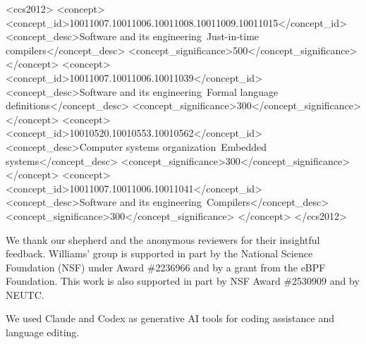 \documentclass[sigplan,10pt]{acmart}
\begin{document}
\begin{CCSXML}
<ccs2012>
 <concept>
  <concept_id>10011007.10011006.10011008.10011009.10011015</concept_id>
  <concept_desc>Software and its engineering~Just-in-time compilers</concept_desc>
  <concept_significance>500</concept_significance>
 </concept>
 <concept>
  <concept_id>10011007.10011006.10011039</concept_id>
  <concept_desc>Software and its engineering~Formal language definitions</concept_desc>
  <concept_significance>300</concept_significance>
 </concept>
 <concept>
  <concept_id>10010520.10010553.10010562</concept_id>
  <concept_desc>Computer systems organization~Embedded systems</concept_desc>
  <concept_significance>300</concept_significance>
 </concept>
 <concept>
  <concept_id>10011007.10011006.10011041</concept_id>
  <concept_desc>Software and its engineering~Compilers</concept_desc>
  <concept_significance>300</concept_significance>
 </concept>
</ccs2012>
\end{CCSXML}




\maketitle
\fancyhf{}
\renewcommand{\headrulewidth}{0pt}










\begin{acks}
We thank our shepherd and the anonymous reviewers for their insightful feedback.
Williams' group is supported in part by the National Science Foundation (NSF) under Award \#2236966 and by a grant from the eBPF Foundation.
This work is also supported in part by NSF Award \#2530909 and by NEUTC.

We used Claude and Codex as generative AI tools for coding assistance and language editing.
\end{acks}



\end{document}
